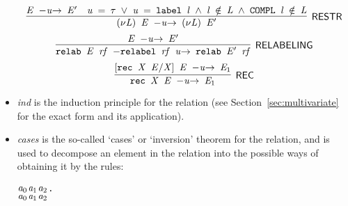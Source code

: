 \begin{itemize}
\begin{equation*}
\end{equation*}
\begin{equation*}
\infer[\HOLRuleName{RESTR}]{\HOLinline{\ensuremath{(\nu}\HOLFreeVar{L}\ensuremath{)} \HOLFreeVar{E} \HOLTokenTransBegin\HOLFreeVar{u}\HOLTokenTransEnd \ensuremath{(\nu}\HOLFreeVar{L}\ensuremath{)} \ensuremath{\HOLFreeVar{E}\sp{\prime}}}}{\HOLinline{\HOLFreeVar{E} \HOLTokenTransBegin\HOLFreeVar{u}\HOLTokenTransEnd \ensuremath{\HOLFreeVar{E}\sp{\prime}}}&\HOLinline{\HOLFreeVar{u} \HOLSymConst{\ensuremath{=}} \HOLSymConst{\ensuremath{\tau}} \HOLSymConst{\HOLTokenDisj{}} \HOLFreeVar{u} \HOLSymConst{\ensuremath{=}} \HOLConst{label} \HOLFreeVar{l} \HOLSymConst{\HOLTokenConj{}} \HOLFreeVar{l} \HOLSymConst{\HOLTokenNotIn{}} \HOLFreeVar{L} \HOLSymConst{\HOLTokenConj{}} \HOLConst{COMPL} \HOLFreeVar{l} \HOLSymConst{\HOLTokenNotIn{}} \HOLFreeVar{L}}}
\end{equation*}
\begin{equation*}
\infer[\HOLRuleName{RELABELING}]{\HOLinline{\HOLConst{relab} \HOLFreeVar{E} \HOLFreeVar{rf} \HOLTokenTransBegin\HOLConst{relabel} \HOLFreeVar{rf} \HOLFreeVar{u}\HOLTokenTransEnd \HOLConst{relab} \ensuremath{\HOLFreeVar{E}\sp{\prime}} \HOLFreeVar{rf}}}{\HOLinline{\HOLFreeVar{E} \HOLTokenTransBegin\HOLFreeVar{u}\HOLTokenTransEnd \ensuremath{\HOLFreeVar{E}\sp{\prime}}}}
\end{equation*}
\begin{equation*}
\infer[\HOLRuleName{REC}]{\HOLinline{\HOLConst{rec} \HOLFreeVar{X} \HOLFreeVar{E} \HOLTokenTransBegin\HOLFreeVar{u}\HOLTokenTransEnd \ensuremath{\HOLFreeVar{E}\sb{\mathrm{1}}}}}{\HOLinline{\ensuremath{[}\HOLConst{rec} \HOLFreeVar{X} \HOLFreeVar{E}\ensuremath{/}\HOLFreeVar{X}\ensuremath{]} \HOLFreeVar{E} \HOLTokenTransBegin\HOLFreeVar{u}\HOLTokenTransEnd \ensuremath{\HOLFreeVar{E}\sb{\mathrm{1}}}}}
\end{equation*}
\item \emph{ind} is the induction principle for the relation
  (see Section~\ref{sec:multivariate} for the exact form and its application).
\item \emph{cases} is the so-called `cases' or `inversion' theorem for
  the relation, and is used to decompose an element in the relation into the possible ways of
  obtaining it by the rules:
\begin{alltt}
\HOLTokenTurnstile{} \HOLSymConst{\HOLTokenForall{}}\ensuremath{\HOLBoundVar{a}\sb{\mathrm{0}}} \ensuremath{\HOLBoundVar{a}\sb{\mathrm{1}}} \ensuremath{\HOLBoundVar{a}\sb{\mathrm{2}}}.
       \ensuremath{\HOLBoundVar{a}\sb{\mathrm{0}}} \HOLTokenTransBegin\ensuremath{\HOLBoundVar{a}\sb{\mathrm{1}}}\HOLTokenTransEnd \ensuremath{\HOLBoundVar{a}\sb{\mathrm{2}}} \HOLSymConst{\HOLTokenEquiv{}}

\end{alltt}
\end{itemize}
